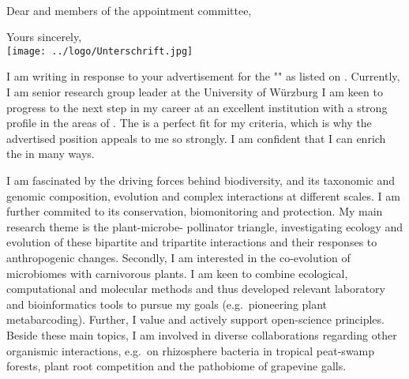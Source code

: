 


\clearpage
\thispagestyle{empty}
\recipient{\vspace{1.2cm}
\recipientname}{
\recipientfunction\\
\universitylong\\
\recipientaddress
}%
\date{\today} %
\opening{\textbf{\positiontitle}\\
\vspace{0.8cm}
Dear {\recipientname} and members of the appointment committee,} %
\closing{Yours sincerely,\\ \texttt{[image: ../logo/Unterschrift.jpg]}\vspace{-1.3cm}} %

\vspace{-0.3cm}

\makelettertitle %
\vspace{-0.3cm}

I am writing in response to your advertisement for the  "{\positiontitle}" %
as listed on {}. Currently, I am senior research group leader at the University of Würzburg\iftoggle{notgerman}{, Germany.}{.} I am keen to progress to the next step in my career at an excellent  institution with a strong profile in the areas of {\universitystrengths}. The {\universitylong} is a perfect fit for  my criteria,
which is why
the advertised position appeals to me so strongly. I am confident that I can enrich the {\faculty} in many ways.

I am fascinated by the driving forces behind biodiversity, and its taxonomic and genomic composition, evolution and complex interactions at different scales. I am further commited to its conservation, biomonitoring and protection. %
 My main research theme is the plant-microbe- pollinator triangle, investigating ecology and evolution of these bipartite and tripartite interactions and their responses to anthropogenic changes. Secondly, I am interested in the co-evolution of microbiomes with carnivorous plants. I am keen to combine ecological, computational and molecular methods %
  and thus developed relevant laboratory and bioinformatics tools to pursue my goals (e.g.~pioneering plant metabarcoding). Further, I value and actively support open-science principles. Beside these main topics, I am involved in diverse  collaborations regarding other organismic interactions, e.g.~on rhizosphere bacteria in tropical peat-swamp forests, plant root competition and the pathobiome of grapevine galls.

